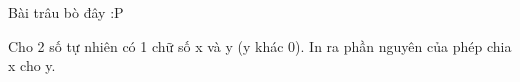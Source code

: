 Bài trâu bò đây :P  

   Cho 2 số tự nhiên có 1 chữ số x và y (y khác 0). In ra phần nguyên của phép chia x cho y.  

\